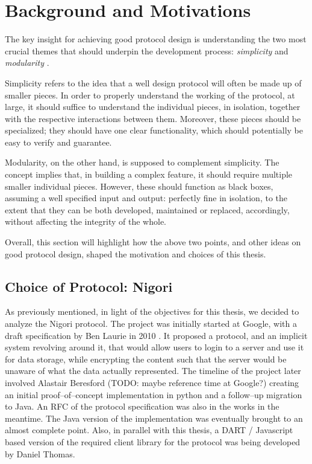 \chapter{Background and Motivations} \label{chapter:background}
The key insight for achieving good protocol design is understanding the two most crucial themes that should underpin the development process: \textit{simplicity} and \textit{modularity} \cite{ProtocolDesign}.

Simplicity refers to the idea that a well design protocol will often be made up of smaller pieces. In order to properly understand the working of the protocol, at large, it should suffice to understand the individual pieces, in isolation, together with the respective interactions between them. Moreover, these pieces should be specialized; they should have one clear functionality, which should potentially be easy to verify and guarantee.

Modularity, on the other hand, is supposed to complement simplicity. The concept implies that, in building a complex feature, it should require multiple smaller individual pieces. However, these should function as black boxes, assuming a well specified input and output: perfectly fine in isolation, to the extent that they can be both developed, maintained or replaced, accordingly, without affecting the integrity of the whole.

Overall, this section will highlight how the above two points, and other ideas on good protocol design, shaped the motivation and choices of this thesis.

\section{Choice of Protocol: Nigori}
As previously mentioned, in light of the objectives for this thesis, we decided to analyze the Nigori protocol.
The project was initially started at Google, with a draft specification by Ben Laurie in 2010 \cite{NigoriDraft}.
It proposed a protocol, and an implicit system revolving around it, that would allow users to login to a server and use it for data storage, while encrypting the content such that the server would be unaware of what the data actually represented.
The timeline of the project later involved Alastair Beresford (TODO: maybe reference time at Google?) creating an initial proof--of--concept implementation in python and a follow--up migration to Java.
An RFC \cite{NigoriRFC} of the protocol specification was also in the works in the meantime.
The Java version of the implementation was eventually brought to an almost complete point.
Also, in parallel with this thesis, a DART \cite{DART} / Javascript based version of the required client library for the protocol was being developed by Daniel Thomas.

